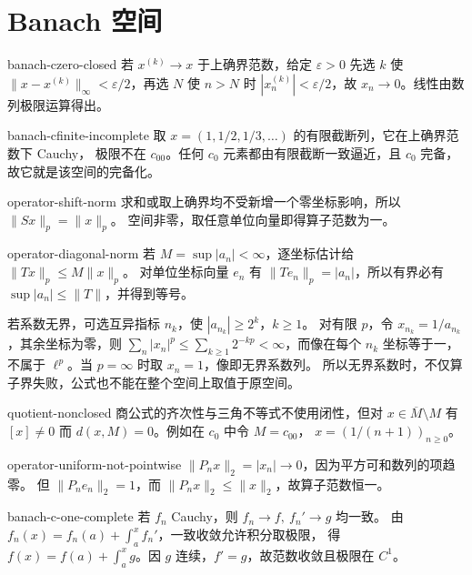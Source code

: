 \chapter{Banach 空间}
\begin{solution}{banach-czero-closed}
若 \(x^{(k)}\to x\) 于上确界范数，给定 \(\varepsilon>0\) 先选 \(k\) 使
\(\|x-x^{(k)}\|_\infty<\varepsilon/2\)，再选 \(N\) 使 \(n>N\) 时
\(|x_n^{(k)}|<\varepsilon/2\)，故 \(x_n\to0\)。线性由数列极限运算得出。
\end{solution}
\begin{solution}{banach-cfinite-incomplete}
取 \(x=(1,1/2,1/3,\ldots)\) 的有限截断列，它在上确界范数下 Cauchy，
极限不在 \(c_{00}\)。任何 \(c_0\) 元素都由有限截断一致逼近，且 \(c_0\)
完备，故它就是该空间的完备化。
\end{solution}
\begin{solution}{operator-shift-norm}
求和或取上确界均不受新增一个零坐标影响，所以 \(\|Sx\|_p=\|x\|_p\)。
空间非零，取任意单位向量即得算子范数为一。
\end{solution}
\begin{solution}{operator-diagonal-norm}
若 \(M=\sup|a_n|<\infty\)，逐坐标估计给 \(\|Tx\|_p\le M\|x\|_p\)。
对单位坐标向量 \(e_n\) 有 \(\|Te_n\|_p=|a_n|\)，所以有界必有
\(\sup|a_n|\le\|T\|\)，并得到等号。

若系数无界，可选互异指标 \(n_k\)，使 \(|a_{n_k}|\ge2^k\)，\(k\ge1\)。
对有限 \(p\)，令 \(x_{n_k}=1/a_{n_k}\)，其余坐标为零，则
\(\sum_n|x_n|^p\le\sum_{k\ge1}2^{-kp}<\infty\)，而像在每个 \(n_k\)
坐标等于一，不属于 \(\ell^p\)。当 \(p=\infty\) 时取 \(x_n=1\)，像即无界系数列。
所以无界系数时，不仅算子界失败，公式也不能在整个空间上取值于原空间。
\end{solution}
\begin{solution}{quotient-nonclosed}
商公式的齐次性与三角不等式不使用闭性，但对 \(x\in\overline M\setminus M\)
有 \([x]\ne0\) 而 \(d(x,M)=0\)。例如在 \(c_0\) 中令 \(M=c_{00}\)，
\(x=(1/(n+1))_{n\ge0}\)。
\end{solution}
\begin{solution}{operator-uniform-not-pointwise}
\(\|P_nx\|_2=|x_n|\to0\)，因为平方可和数列的项趋零。
但 \(\|P_ne_n\|_2=1\)，而 \(\|P_nx\|_2\le\|x\|_2\)，故算子范数恒一。
\end{solution}
\begin{solution}{banach-c-one-complete}
若 \(f_n\) Cauchy，则 \(f_n\to f,\ f_n'\to g\) 均一致。
由 \(f_n(x)=f_n(a)+\int_a^xf_n'\)，一致收敛允许积分取极限，
得 \(f(x)=f(a)+\int_a^xg\)。因 \(g\) 连续，\(f'=g\)，故范数收敛且极限在 \(C^1\)。
\end{solution}

